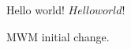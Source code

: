\documentclass[12pt]{article}
\begin{document}
Hello world!
$Hello world!$ %

MWM initial change.
\end{document}
